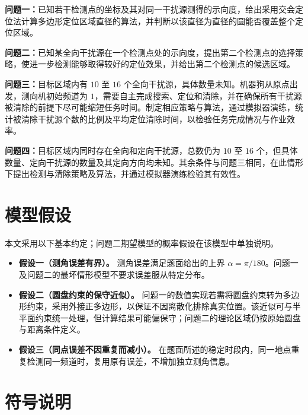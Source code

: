 \documentclass[UTF8,a4paper,zihao=-4,fontset=none]{ctexart}
\begin{document}
\textbf{问题一：}已知若干检测点的坐标及其对同一干扰源测得的示向度，给出采用交会定位法计算多边形定位区域直径的算法，并判断以该直径为直径的圆能否覆盖整个定位区域。

\textbf{问题二：}已知某全向干扰源在一个检测点处的示向度，提出第二个检测点的选择策略，使进一步检测能够取得较好的定位效果，并给出第二个检测点的候选区域。

\textbf{问题三：}目标区域内有 \(10\) 至 \(16\) 个全向干扰源，具体数量未知。机器狗从原点出发，测向机初始频道为 \(1\)，需要自主完成搜索、定位和清除，并在确保所有干扰源被清除的前提下尽可能缩短任务时间。制定相应策略与算法，通过模拟器演练，统计被清除干扰源个数的比例及平均定位清除时间，以检验任务完成情况与作业效率。

\textbf{问题四：}目标区域内同时存在全向和定向干扰源，总数仍为 \(10\) 至 \(16\) 个，但具体数量、定向干扰源的数量及其定向方向均未知。其余条件与问题三相同，在此情形下提出检测与清除策略及算法，并通过模拟器演练检验其有效性。

\section{模型假设}

本文采用以下基本约定；问题二期望模型的概率假设在该模型中单独说明。

\begin{itemize}[label=\textbullet,leftmargin=2em]
  \item \textbf{假设一（测角误差有界）。} 测角误差满足题面给出的上界 \(\alpha=\pi/180\)。问题一及问题二的最坏情形模型不要求误差服从特定分布。
  \item \textbf{假设二（圆盘约束的保守近似）。} 问题一的数值实现若需将圆盘约束转为多边形约束，采用外接正多边形，以保证不因离散化排除真实位置。该近似可与半平面约束统一处理，但计算结果可能偏保守；问题二的理论区域仍按原始圆盘与距离条件定义。
  \item \textbf{假设三（同点误差不因重复而减小）。} 在题面所述的稳定时段内，同一地点重复检测同一频道时，复用原有误差，不增加独立测角信息。
\end{itemize}

\section{符号说明}
\end{document}
